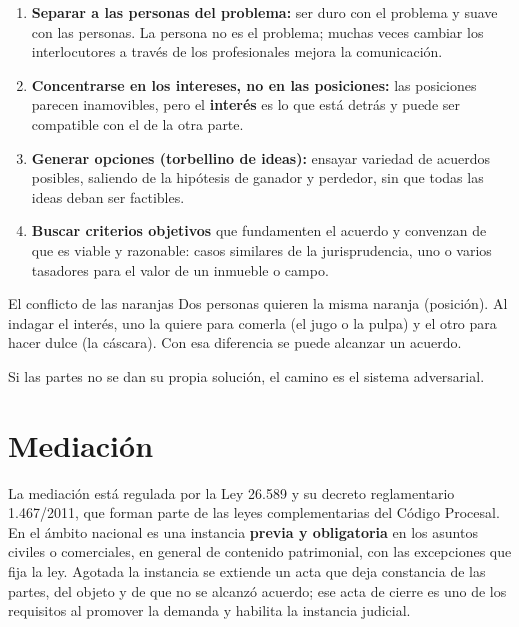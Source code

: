\documentclass[12pt,oneside]{book}
\begin{document}
\begin{enumerate}
\item \textbf{Separar a las personas del problema:} ser duro con el problema y suave con las personas. La persona no es el problema; muchas veces cambiar los interlocutores a través de los profesionales mejora la comunicación.
\item \textbf{Concentrarse en los intereses, no en las posiciones:} las posiciones parecen inamovibles, pero el \textbf{interés} es lo que está detrás y puede ser compatible con el de la otra parte.
\item \textbf{Generar opciones (torbellino de ideas):} ensayar variedad de acuerdos posibles, saliendo de la hipótesis de ganador y perdedor, sin que todas las ideas deban ser factibles.
\item \textbf{Buscar criterios objetivos} que fundamenten el acuerdo y convenzan de que es viable y razonable: casos similares de la jurisprudencia, uno o varios tasadores para el valor de un inmueble o campo.
\end{enumerate}

\begin{example}{El conflicto de las naranjas}
Dos personas quieren la misma naranja (posición). Al indagar el interés, uno la quiere para comerla (el jugo o la pulpa) y el otro para hacer dulce (la cáscara). Con esa diferencia se puede alcanzar un acuerdo.
\end{example}

Si las partes no se dan su propia solución, el camino es el sistema adversarial.

\section{Mediación}

La mediación está regulada por la Ley 26.589 y su decreto reglamentario 1.467/2011, que forman parte de las leyes complementarias del Código Procesal. En el ámbito nacional es una instancia \textbf{previa y obligatoria} en los asuntos civiles o comerciales, en general de contenido patrimonial, con las excepciones que fija la ley. Agotada la instancia se extiende un acta que deja constancia de las partes, del objeto y de que no se alcanzó acuerdo; ese acta de cierre es uno de los requisitos al promover la demanda y habilita la instancia judicial.
\end{document}

